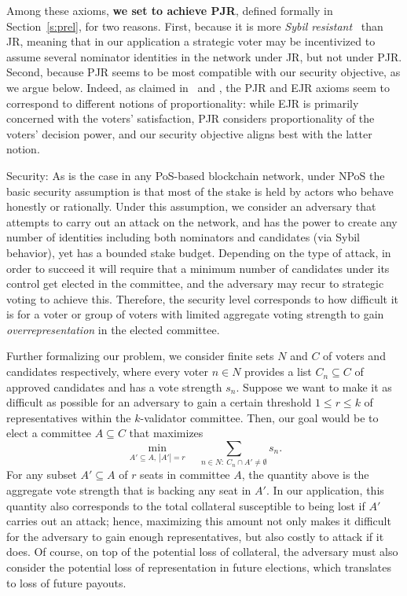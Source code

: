 Among these axioms, \textbf{we set to achieve PJR}, defined formally in Section~\ref{s:prel}, for two reasons. 
First, because it is more \emph{Sybil resistant}~\cite{douceur2002sybil} than JR, meaning that in our application a strategic voter may be incentivized to assume several nominator identities in the network under JR, but not under PJR. 
Second, because PJR seems to be most compatible with our security objective, as we argue below. Indeed, as claimed in~\cite{peters2019proportionality} and \cite{lackner2020approval}, the PJR and EJR axioms seem to correspond to different notions of proportionality: while EJR is primarily concerned with the voters' satisfaction, PJR considers proportionality of the voters' decision power, and our security objective aligns best with the latter notion.

Security: 
As is the case in any PoS-based blockchain network, under NPoS the basic security assumption is that most of the stake is held by actors who behave honestly or rationally. Under this assumption, we consider an adversary that attempts to carry out an attack on the network, and has the power to create any number of identities including both nominators and candidates (via Sybil behavior), yet has a bounded stake budget. Depending on the type of attack, in order to succeed it will require that a minimum number of candidates under its control get elected in the committee, and the adversary may recur to strategic voting to achieve this. Therefore, the security level corresponds to how difficult it is for a voter or group of voters with limited aggregate voting strength to gain \emph{overrepresentation} in the elected committee. 

Further formalizing our problem, we consider finite sets $N$ and $C$ of voters and candidates respectively, where every voter $n\in N$ provides a list $C_n\subseteq C$ of approved candidates and has a vote strength $s_n$. 
Suppose we want to make it as difficult as possible for an adversary to gain a certain threshold $1\leq r\leq k$ of representatives within the $k$-validator committee. 
Then, our goal would be to elect a committee $A\subseteq C$ that maximizes 
$$\min_{A'\subseteq A, \  |A'|=r} \quad \sum_{n\in N: \ C_n\cap A'\neq \emptyset} s_n.$$ 
%
For any subset $A'\subseteq A$ of $r$ seats in committee $A$, the quantity above is the aggregate vote strength that is backing any seat in $A'$. In our application, this quantity also corresponds to the total collateral susceptible to being lost if $A'$ carries out an attack; hence, maximizing this amount not only makes it difficult for the adversary to gain enough representatives, but also costly to attack if it does. Of course, on top of the potential loss of collateral, the adversary must also consider the potential loss of representation in future elections, which translates to loss of future payouts. %

